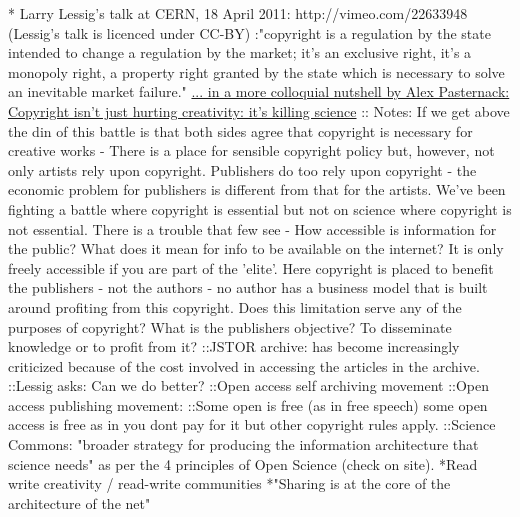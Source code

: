 \documentclass[final,authoryear,3p]{elsarticle-open-drafting}
\begin{document}
* Larry Lessig's talk at CERN, 18 April 2011: http://vimeo.com/22633948 (Lessig's talk is licenced under CC-BY) 
:"copyright is a regulation by the state intended to change a regulation by the market; it's an exclusive right, it's a monopoly right, a property right granted by the state which is necessary to solve an inevitable market failure." \href{http://motherboard.tv/2011/4/25/lessig-copyright-isn-t-just-hurting-creativity-it-s-killing-science-video--2}{ ... in a more colloquial nutshell by Alex Pasternack: Copyright isn't just hurting creativity: it's killing science} 
:: Notes: If we get above the din of this battle is that both sides agree that copyright is necessary for creative works - There is a place for sensible copyright policy but, however, not only artists rely upon copyright. Publishers do too rely upon copyright - the economic problem for publishers is different from that for the artists. We've been fighting a battle where copyright is essential but not on science where copyright is not essential. There is a trouble that few see - How accessible is information for the public? What does it mean for info to be available on the internet? It is only freely accessible if you are part of the 'elite'. Here copyright is placed to benefit the publishers - not the authors - no author has a business model that is built around profiting from this copyright. Does this limitation serve any of the purposes of copyright? What is the publishers objective? To disseminate knowledge or to profit from it? 
::JSTOR archive: has become increasingly criticized because of the cost involved in accessing the articles in the archive. 
::Lessig asks: Can we do better? 
::Open access self archiving movement
::Open access publishing movement:
::Some open is free (as in free speech) some open access is free as in you dont pay for it but other copyright rules apply.
::Science Commons: "broader strategy for producing the information architecture that science needs" as per the 4 principles of Open Science (check on site).
*Read write creativity / read-write communities
*"Sharing is at the core of the architecture of the net"
\end{document}
